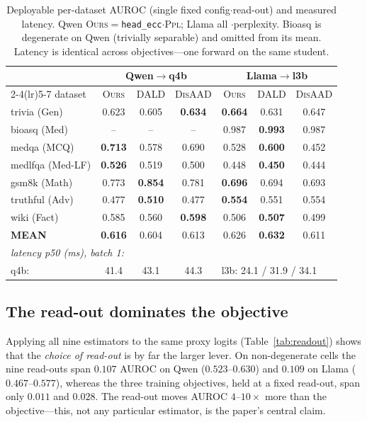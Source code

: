 \documentclass[11pt]{article}
\newcommand{\ours}{\textsc{Ours}}
\newcommand{\dald}{\textsc{DALD}}
\newcommand{\disaad}{\textsc{DisAAD}}
\newcommand{\ppl}{\textsc{Ppl}}
\newcommand{\best}[1]{\textbf{#1}}
\begin{document}
\begin{table}[t]\centering\small
\setlength{\tabcolsep}{3pt}
\begin{tabular}{l ccc ccc}
\toprule
& \multicolumn{3}{c}{\textbf{Qwen}$\to$q4b} & \multicolumn{3}{c}{\textbf{Llama}$\to$l3b}\\
\cmidrule(lr){2-4}\cmidrule(lr){5-7}
dataset & \ours & \dald & \disaad & \ours & \dald & \disaad\\
\midrule
trivia (Gen)     & 0.623 & 0.605 & \best{0.634} & \best{0.664} & 0.631 & 0.647\\
bioasq (Med)     & --    & --    & --    & 0.987 & \best{0.993} & 0.987\\
medqa (MCQ)      & \best{0.713} & 0.578 & 0.690 & 0.528 & \best{0.600} & 0.452\\
medlfqa (Med-LF) & \best{0.526} & 0.519 & 0.500 & 0.448 & \best{0.450} & 0.444\\
gsm8k (Math)     & 0.773 & \best{0.854} & 0.781 & \best{0.696} & 0.694 & 0.693\\
truthful (Adv)   & 0.477 & \best{0.510} & 0.477 & \best{0.554} & 0.551 & 0.554\\
wiki (Fact)      & 0.585 & 0.560 & \best{0.598} & 0.506 & \best{0.507} & 0.499\\
\midrule
\textbf{MEAN}    & \best{0.616} & 0.604 & 0.613 & 0.626 & \best{0.632} & 0.611\\
\midrule
\multicolumn{7}{l}{\emph{latency p50 (ms), batch 1:}}\\
q4b: & 41.4 & 43.1 & 44.3 & \multicolumn{3}{l}{l3b: 24.1 / 31.9 / 34.1}\\
\bottomrule
\end{tabular}
\caption{Deployable per-dataset AUROC (single fixed config$\cdot$read-out) and measured
latency. Qwen \ours$=$\texttt{head\_ecc}$\cdot$\ppl; Llama all $\cdot$perplexity. Bioasq
is degenerate on Qwen (trivially separable) and omitted from its mean. Latency is
identical across objectives---one forward on the same student.}
\label{tab:perds}
\end{table}

\subsection{The read-out dominates the objective}\label{sec:readout}

Applying all nine estimators to the same proxy logits (Table~\ref{tab:readout}) shows that
the \emph{choice of read-out} is by far the larger lever. On non-degenerate cells the nine
read-outs span $0.107$ AUROC on Qwen ($0.523$--$0.630$) and $0.109$ on Llama
($0.467$--$0.577$), whereas the three training objectives, held at a fixed read-out, span only
$0.011$ and $0.028$. The read-out moves AUROC $4$--$10\times$ more than the objective---this,
not any particular estimator, is the paper's central claim.
\end{document}
